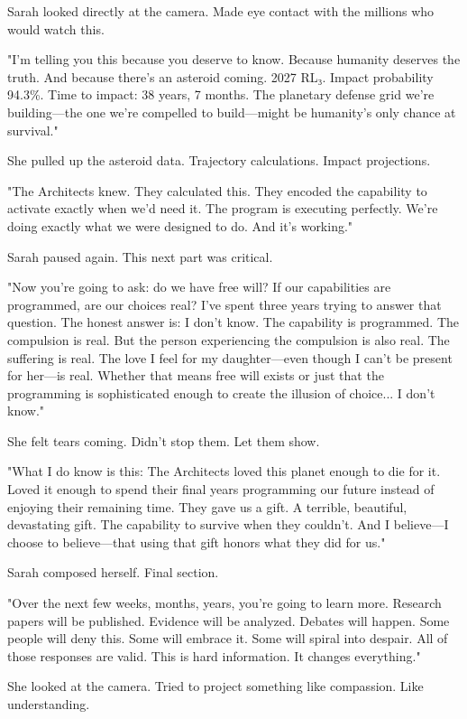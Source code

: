 Sarah looked directly at the camera. Made eye contact with the millions who would watch this.

"I'm telling you this because you deserve to know. Because humanity deserves the truth. And because there's an asteroid coming. 2027 RL₃. Impact probability 94.3\%. Time to impact: 38 years, 7 months. The planetary defense grid we're building—the one we're compelled to build—might be humanity's only chance at survival."

She pulled up the asteroid data. Trajectory calculations. Impact projections.

"The Architects knew. They calculated this. They encoded the capability to activate exactly when we'd need it. The program is executing perfectly. We're doing exactly what we were designed to do. And it's working."

Sarah paused again. This next part was critical.

"Now you're going to ask: do we have free will? If our capabilities are programmed, are our choices real? I've spent three years trying to answer that question. The honest answer is: I don't know. The capability is programmed. The compulsion is real. But the person experiencing the compulsion is also real. The suffering is real. The love I feel for my daughter—even though I can't be present for her—is real. Whether that means free will exists or just that the programming is sophisticated enough to create the illusion of choice... I don't know."

She felt tears coming. Didn't stop them. Let them show.

"What I do know is this: The Architects loved this planet enough to die for it. Loved it enough to spend their final years programming our future instead of enjoying their remaining time. They gave us a gift. A terrible, beautiful, devastating gift. The capability to survive when they couldn't. And I believe—I choose to believe—that using that gift honors what they did for us."

Sarah composed herself. Final section.

"Over the next few weeks, months, years, you're going to learn more. Research papers will be published. Evidence will be analyzed. Debates will happen. Some people will deny this. Some will embrace it. Some will spiral into despair. All of those responses are valid. This is hard information. It changes everything."

She looked at the camera. Tried to project something like compassion. Like understanding.

